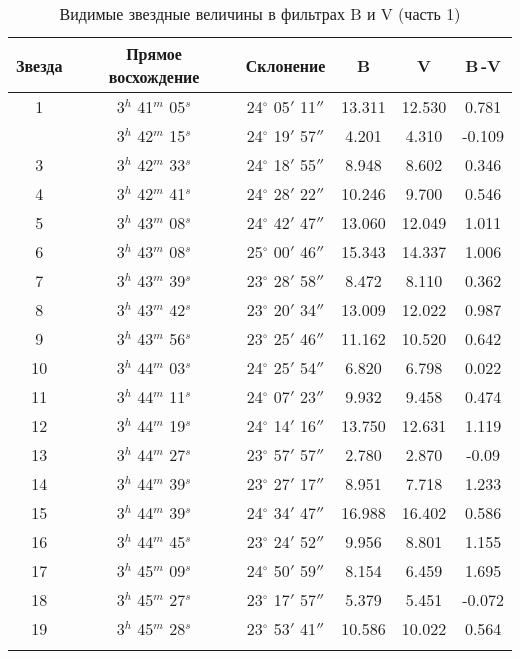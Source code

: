 \begin{table}[h]
  \centering
  \caption{Видимые звездные величины в фильтрах B и V (часть 1)}
  \begin{tabular}{cccccc}
    \toprule
    Звезда &
    Прямое восхождение &
    Склонение &
    B &
    V &
    B\,-V \\
    \midrule
    1 & 3$^h$ 41$^m$ 05$^s$ & 24$^\circ$ 05$'$ 11$''$ & 13.311 & 12.530 & 0.781 \\
    \arrayrulecolor{black!40}
    \midrule
    2 & 3$^h$ 42$^m$ 15$^s$ & 24$^\circ$ 19$'$ 57$''$ & 4.201 & 4.310 & -0.109 \\
    \midrule
    3 & 3$^h$ 42$^m$ 33$^s$ & 24$^\circ$ 18$'$ 55$''$ & 8.948 & 8.602 & 0.346 \\
    \midrule
    4 & 3$^h$ 42$^m$ 41$^s$ & 24$^\circ$ 28$'$ 22$''$ & 10.246 & 9.700 & 0.546 \\
    \midrule
    5 & 3$^h$ 43$^m$ 08$^s$ & 24$^\circ$ 42$'$ 47$''$ & 13.060 & 12.049 & 1.011 \\
    \midrule
    6 & 3$^h$ 43$^m$ 08$^s$ & 25$^\circ$ 00$'$ 46$''$ & 15.343 & 14.337 & 1.006 \\
    \midrule
    7 & 3$^h$ 43$^m$ 39$^s$ & 23$^\circ$ 28$'$ 58$''$ & 8.472 & 8.110 & 0.362 \\
    \midrule
    8 & 3$^h$ 43$^m$ 42$^s$ & 23$^\circ$ 20$'$ 34$''$ & 13.009 & 12.022 & 0.987 \\
    \midrule
    9 & 3$^h$ 43$^m$ 56$^s$ & 23$^\circ$ 25$'$ 46$''$ & 11.162 & 10.520 & 0.642 \\
    \midrule
    10 & 3$^h$ 44$^m$ 03$^s$ & 24$^\circ$ 25$'$ 54$''$ & 6.820 & 6.798 & 0.022 \\
    \midrule
    11 & 3$^h$ 44$^m$ 11$^s$ & 24$^\circ$ 07$'$ 23$''$ & 9.932 & 9.458 & 0.474 \\
    \midrule
    12 & 3$^h$ 44$^m$ 19$^s$ & 24$^\circ$ 14$'$ 16$''$ & 13.750 & 12.631 & 1.119 \\
    \midrule
    13 & 3$^h$ 44$^m$ 27$^s$ & 23$^\circ$ 57$'$ 57$''$ & 2.780 & 2.870 & -0.09 \\
    \midrule
    14 & 3$^h$ 44$^m$ 39$^s$ & 23$^\circ$ 27$'$ 17$''$ & 8.951 & 7.718 & 1.233 \\
    \midrule
    15 & 3$^h$ 44$^m$ 39$^s$ & 24$^\circ$ 34$'$ 47$''$ & 16.988 & 16.402 & 0.586 \\
    \midrule
    16 & 3$^h$ 44$^m$ 45$^s$ & 23$^\circ$ 24$'$ 52$''$ & 9.956 & 8.801 & 1.155 \\
    \midrule
    17 & 3$^h$ 45$^m$ 09$^s$ & 24$^\circ$ 50$'$ 59$''$ & 8.154 & 6.459 & 1.695 \\
    \midrule
    18 & 3$^h$ 45$^m$ 27$^s$ & 23$^\circ$ 17$'$ 57$''$ & 5.379 & 5.451 & -0.072 \\
    \midrule
    19 & 3$^h$ 45$^m$ 28$^s$ & 23$^\circ$ 53$'$ 41$''$ & 10.586 & 10.022 & 0.564 \\
    \arrayrulecolor{black}
    \bottomrule
  \end{tabular}
\end{table}

